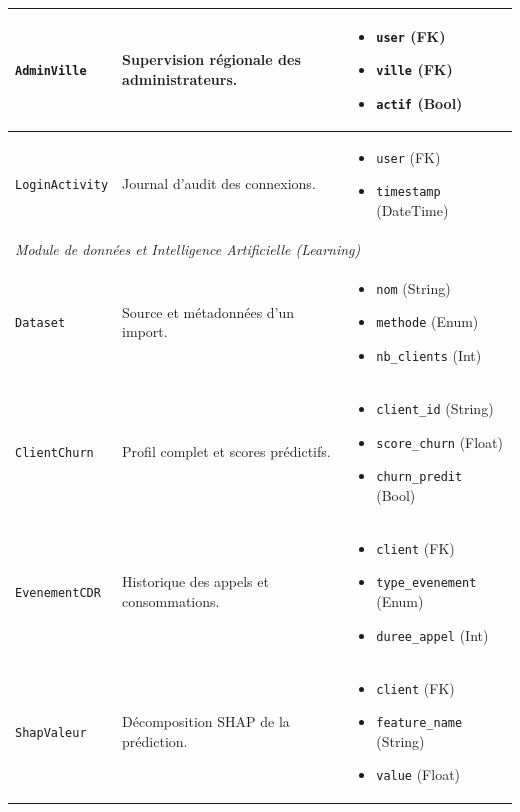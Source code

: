 \begin{footnotesize}
\begin{longtable}{|p{2.5cm}|p{4.5cm}|p{6cm}|}
    \hline
    \texttt{AdminVille} & Supervision régionale des administrateurs. & \begin{itemize}[leftmargin=*, nosep] \item \texttt{user} (FK) \item \texttt{ville} (FK) \item \texttt{actif} (Bool) \end{itemize} \\
    \hline
    \texttt{LoginActivity} & Journal d'audit des connexions. & \begin{itemize}[leftmargin=*, nosep] \item \texttt{user} (FK) \item \texttt{timestamp} (DateTime) \end{itemize} \\
    \hline

    \multicolumn{3}{|l|}{\textit{Module de données et Intelligence Artificielle (Learning)}} \\
    \hline
    \texttt{Dataset} & Source et métadonnées d'un import. & \begin{itemize}[leftmargin=*, nosep] \item \texttt{nom} (String) \item \texttt{methode} (Enum) \item \texttt{nb\_clients} (Int) \end{itemize} \\
    \hline
    \texttt{ClientChurn} & Profil complet et scores prédictifs. & \begin{itemize}[leftmargin=*, nosep] \item \texttt{client\_id} (String) \item \texttt{score\_churn} (Float) \item \texttt{churn\_predit} (Bool) \end{itemize} \\
    \hline
    \texttt{EvenementCDR} & Historique des appels et consommations. & \begin{itemize}[leftmargin=*, nosep] \item \texttt{client} (FK) \item \texttt{type\_evenement} (Enum) \item \texttt{duree\_appel} (Int) \end{itemize} \\
    \hline
    \texttt{ShapValeur} & Décomposition SHAP de la prédiction. & \begin{itemize}[leftmargin=*, nosep] \item \texttt{client} (FK) \item \texttt{feature\_name} (String) \item \texttt{value} (Float) \end{itemize} \\
    \hline


\end{longtable}
\end{footnotesize}
